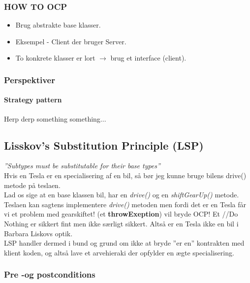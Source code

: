 \subsubsection{HOW TO OCP}

\begin{itemize}
	\item Brug abstrakte base klasser.
	\item Eksempel - Client der bruger Server.
	\item To konkrete klasser er lort $\longrightarrow$ brug et interface (client).
\end{itemize}

\subsubsection{Perspektiver}

\paragraph{Strategy pattern} 
Herp derp something something...

\subsection{Lisskov's Substitution Principle (LSP)}
\textit{''Subtypes must be substitutable for their base types''}\\

Hvis en Tesla er en specialisering af en bil, så bør jeg kunne bruge bilens drive() metode på teslaen.\\

Lad os sige at en base klassen bil, har en \textit{drive()} og en \textit{shiftGearUp()} metode. Teslaen kan sagtens implementere \textit{drive()} metoden men fordi det er en Tesla får vi et problem med gearskiftet! (et \textbf{throwExeption}) vil bryde OCP! Et \textcolor{green!60!black}{//Do Nothing} er sikkert fint men ikke særligt sikkert. Altså er en Tesla ikke en bil i Barbara Liskovs optik.\\

LSP handler dermed i bund og grund om ikke at bryde ”er en” kontrakten med klient koden, og altså lave et arvehieraki der opfylder en ægte specialisering.

\subsubsection{Pre -og postconditions}

